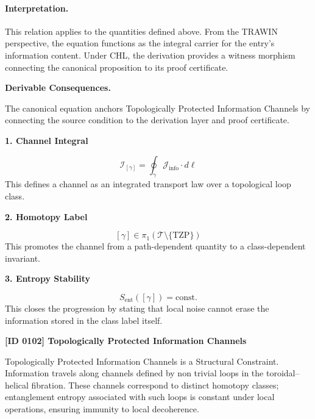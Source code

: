 \paragraph{Interpretation.}
This relation applies to the quantities defined above. From the TRAWIN perspective, the equation functions as the integral carrier for the entry’s information content. Under CHL, the derivation provides a witness morphism connecting the canonical proposition to its proof certificate.

\par\vspace{0.35em}
\noindent\textbf{Derivable Consequences.}\quad
\begingroup
\footnotesize
\raggedright
The canonical equation anchors Topologically Protected Information Channels by connecting the source condition to the derivation layer and proof certificate.
\par\endgroup

\noindent\textbf{1. Channel Integral}\par
\[
\mathcal{I}_{[\gamma]} = \oint_{\gamma} \mathcal{J}_{\mathrm{info}}\cdot d\ell
\]
\noindent This defines a channel as an integrated transport law over a topological loop class.\par
\noindent\textbf{2. Homotopy Label}\par
\[
[\gamma] \in \pi_1(\mathscr{T}\setminus\{\mathrm{TZP}\})
\]
\noindent This promotes the channel from a path-dependent quantity to a class-dependent invariant.\par
\noindent\textbf{3. Entropy Stability}\par
\[
S_{\mathrm{ent}}([\gamma]) = \mathrm{const.}
\]
\noindent This closes the progression by stating that local noise cannot erase the information stored in the class label itself.\par

\clearpage
\noindent\textbf{[ID 0102] Topologically Protected Information Channels}\par
\vspace{0.35em}
\begingroup\small
{}
Topologically Protected Information Channels is a Structural Constraint. Information travels along channels defined by non trivial loops in the toroidal--helical fibration. These channels correspond to distinct homotopy classes; entanglement entropy associated with such loops is constant under local operations, ensuring immunity to local decoherence.

